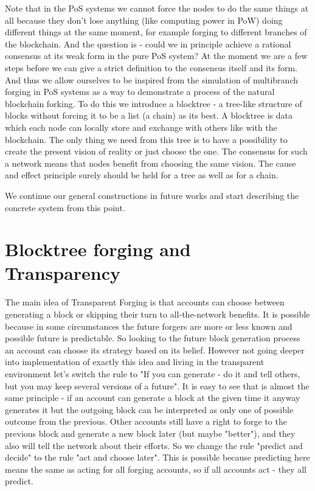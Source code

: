 \documentclass[12pt]{article}
\begin{document}
Note that in the PoS systems we cannot force the nodes to do the same things at all because they don't lose anything (like computing power in PoW) doing 
different things at the same moment, for example forging to different branches of the blockchain. And the question is \-- could we in principle achieve a rational
consensus at its weak form in the pure PoS system? At the moment we are a few steps before we can give a strict definition to the consensus itself and its form. 
And thus we allow ourselves to be inspired from the simulation of multibranch forging in PoS systems as a way to demonstrate a process of the natural 
blockchain forking. To do this we introduce a blocktree \-- a tree-like structure of blocks without 
forcing it to be a list (a chain) as its best. A blocktree is data which each node can locally store and exchange with others like with the blockchain. 
The only thing we need from this tree is to have a possibility to create the present vision of reality or just choose the one. 
The consensus for such a network means that nodes benefit from choosing the same vision. The cause
and effect principle surely should be held for a tree as well as for a chain. 

We continue our general constructions in future works and start describing the concrete system from this point.

\section{Blocktree forging and Transparency}
The main idea of Transparent Forging is that accounts can choose between generating a block or skipping 
their turn to all-the-network benefits. 
It is possible because in some circumstances the future forgers are more or less known and possible future is predictable. So looking to the future block generation
process an account can choose its strategy based on its belief. However not going deeper into implementation of exactly this idea and living in the 
transparent environment let's switch the rule to "If you can generate - do it and tell others, but you may keep several versions of a future". It is easy to see
that is almost the same principle \-- if an account can generate a block at the given time it anyway generates it but the outgoing block 
can be interpreted as only one of possible outcome from the previous. Other accounts still have a right to forge to the previous block and generate a 
new block later (but maybe "better"), and they also will tell the 
network about their efforts. So we change the rule "predict and decide" to the rule "act and choose later". This is possible because predicting here means the
same as acting for all forging accounts, so if all accounts act \-- they all predict. 
\end{document}

